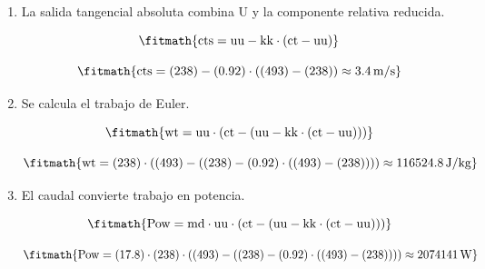 \begin{enumerate}

\item La salida tangencial absoluta combina U y la componente relativa reducida.

\[\fitmath{\mathrm{cts}=\mathrm{uu}-\mathrm{kk}\cdot \left(\mathrm{ct}-\mathrm{uu}\right)}\]

\[\fitmath{\mathrm{cts}=(238)-(0.92)\cdot \left((493)-(238)\right)\approx 3.4\,\mathrm{m/s}}\]

\item Se calcula el trabajo de Euler.

\[\fitmath{\mathrm{wt}=\mathrm{uu}\cdot \left(\mathrm{ct}-\left(\mathrm{uu}-\mathrm{kk}\cdot \left(\mathrm{ct}-\mathrm{uu}\right)\right)\right)}\]

\[\fitmath{\mathrm{wt}=(238)\cdot \left((493)-\left((238)-(0.92)\cdot \left((493)-(238)\right)\right)\right)\approx 116524.8\,\mathrm{J/kg}}\]

\item El caudal convierte trabajo en potencia.

\[\fitmath{\mathrm{Pow}=\mathrm{md}\cdot \mathrm{uu}\cdot \left(\mathrm{ct}-\left(\mathrm{uu}-\mathrm{kk}\cdot \left(\mathrm{ct}-\mathrm{uu}\right)\right)\right)}\]

\[\fitmath{\mathrm{Pow}=(17.8)\cdot (238)\cdot \left((493)-\left((238)-(0.92)\cdot \left((493)-(238)\right)\right)\right)\approx 2074141\,\mathrm{W}}\]

\end{enumerate}
